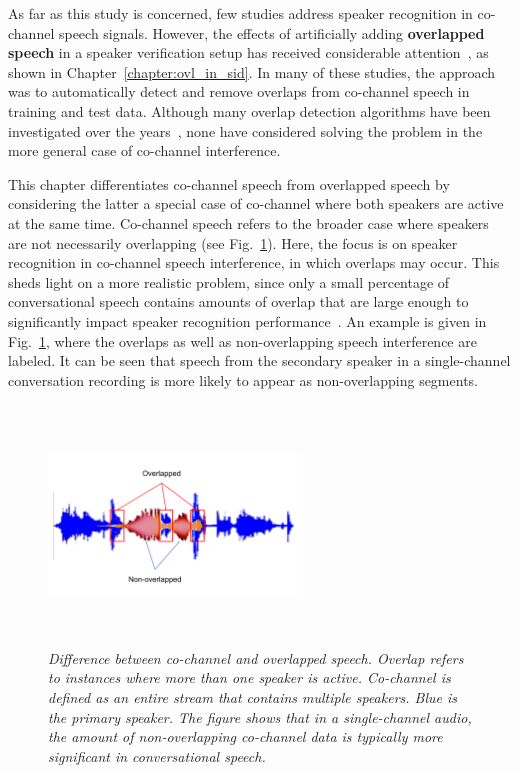 As far as this study is concerned, few studies address speaker recognition in co-channel speech signals. 
However, the effects of artificially adding {\bf overlapped speech} in a speaker verification setup has received considerable attention~\cite{yantorno_report,yantorno_SID,Dwang_03}, as shown in Chapter~\ref{chapter:ovl_in_sid}. 
In many of these studies, the approach was to automatically detect and remove overlaps from co-channel speech in training and test data. 
Although many overlap detection algorithms have been investigated over the years~\cite{Boakye_icassp_08,nav_icassp13,smolenski_tut,sapvr_2000}, none have considered solving the problem in the more general case of co-channel interference. 

This chapter differentiates co-channel speech from overlapped speech by considering the latter a special case of co-channel where both speakers are active at the same time. 
Co-channel speech refers to the broader case where speakers are not necessarily overlapping (see Fig.~\ref{fig:cochannel_vs_overlap}). 
Here, the focus is on speaker recognition in co-channel speech interference, in which overlaps may occur.  
This sheds light on a more realistic problem, since only a small percentage of conversational speech contains amounts of overlap that are large enough to significantly impact speaker recognition performance~\cite{cetin_shriberg_06_icassp,smolenski_tut}. 
An example is given in Fig.~\ref{fig:cochannel_vs_overlap}, where the overlaps as well as non-overlapping speech interference are labeled. 
It can be seen that speech from the secondary speaker in a single-channel conversation recording is more likely to appear as non-overlapping segments. 

\begin{figure}[t!]
	\centering
	\vspace{0mm}
	\includegraphics[height = 2.5in, width=0.6\textwidth]{figures/overlapped_vs_cochannel_spkrrec}
	\vspace{-3mm}
	\caption{\it \small Difference between co-channel and overlapped speech. Overlap refers to instances where more than one speaker is active. Co-channel is defined as an entire stream that contains multiple speakers. Blue is the primary speaker. The figure shows that in a single-channel audio, the amount of non-overlapping co-channel data is typically more significant in conversational speech.}
	\label{fig:cochannel_vs_overlap}
	\vspace{-3mm}
\end{figure}


